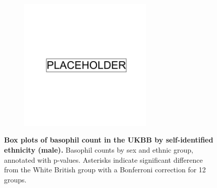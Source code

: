 \begin{figure}[ht]
    \centering
    \begin{subfigure}{\textwidth}
    \includegraphics[width=0.7\textwidth]{placeholder.png}
    \end{subfigure}
    \caption[Box plots of basophil count in the UKBB by self-identified ethnicity (male)]{\textbf{Box plots of basophil count in the UKBB by self-identified ethnicity (male).} Basophil counts by sex and ethnic group, annotated with p-values. Asterisks indicate significant difference from the White British group with a Bonferroni correction for 12 groups.}
    \label{fig:supp_box_basophill_m}
\end{figure}

\newpage

